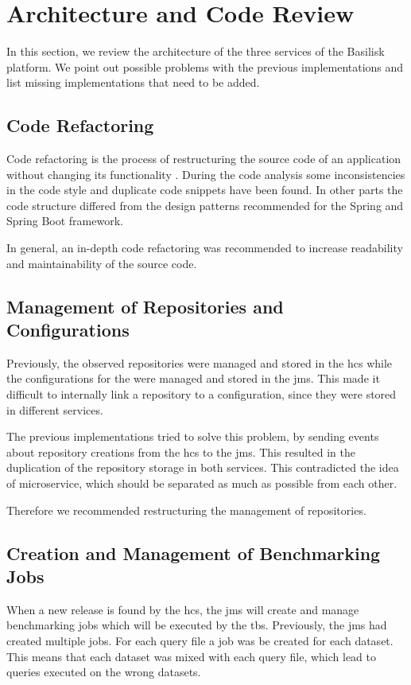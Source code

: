 \section{Architecture and Code Review}
\label{sec:architecture_review}
In this section, we review the architecture of the three services of the Basilisk platform.
We point out possible problems with the previous implementations and list missing implementations that need to be added.


\subsection{Code Refactoring}
\label{sec:code_refactor}
Code refactoring is the process of restructuring the source code of an application without changing its functionality \cite{fowlerRefactoringImprovingDesign2019a}.
During the code analysis some inconsistencies in the code style and duplicate code snippets have been found.
In other parts the code structure differed from the design patterns recommended for the Spring and Spring Boot framework.

In general, an in-depth code refactoring was recommended to increase readability and maintainability of the source code. 


\subsection{Management of Repositories and Configurations}
\label{sec:management_repo_config}
Previously, the observed repositories were managed and stored in the \ac{hcs} while the configurations for the \tsp{} were managed and stored in the \ac{jms}.
This made it difficult to internally link a repository to a \ts{} configuration, since they were stored in different services.

The previous implementations tried to solve this problem, by sending events about repository creations from the \ac{hcs} to the \ac{jms}.
This resulted in the duplication of the repository storage in both services.
This contradicted the idea of microservice, which should be separated as much as possible from each other.

Therefore we recommended restructuring the management of repositories.


\subsection{Creation and Management of Benchmarking Jobs}
\label{sec:creation_of_benchmark_jobs}
When a new release is found by the \ac{hcs}, the \acl{jms} will create and manage benchmarking jobs which will be executed by the \ac{tbs}.
Previously, the \ac{jms} had created multiple jobs.
For each query file a job was be created for each dataset.
This means that each dataset was mixed with each query file, which lead to queries executed on the wrong datasets.

